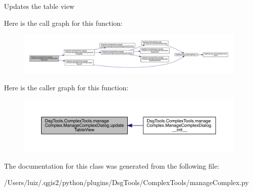 \begin{DoxyVerb}Updates the table view
\end{DoxyVerb}
 Here is the call graph for this function\+:
\nopagebreak
\begin{figure}[H]
\begin{center}
\leavevmode
\includegraphics[width=350pt]{class_dsg_tools_1_1_complex_tools_1_1manage_complex_1_1_manage_complex_dialog_afe2e6fe71eeb7263f7526ec50014edb4_cgraph}
\end{center}
\end{figure}
Here is the caller graph for this function\+:
\nopagebreak
\begin{figure}[H]
\begin{center}
\leavevmode
\includegraphics[width=350pt]{class_dsg_tools_1_1_complex_tools_1_1manage_complex_1_1_manage_complex_dialog_afe2e6fe71eeb7263f7526ec50014edb4_icgraph}
\end{center}
\end{figure}


The documentation for this class was generated from the following file\+:\begin{DoxyCompactItemize}
\item 
/\+Users/luiz/.\+qgis2/python/plugins/\+Dsg\+Tools/\+Complex\+Tools/manage\+Complex.\+py\end{DoxyCompactItemize}
